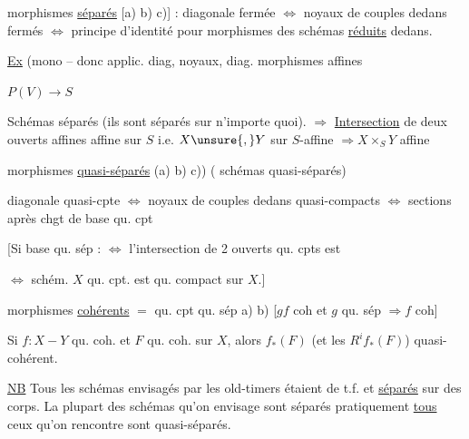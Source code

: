 
morphismes \uline{séparés} [a) b) c)] : diagonale fermée $\Longleftrightarrow$ noyaux de couples dedans fermés $\Longleftrightarrow$ principe d'identité pour morphismes des schémas \uline{réduits} dedans.

\uline{Ex} (mono -- donc applic. diag, noyaux, diag. morphismes affines


$P(V)\longrightarrow S$

Schémas séparés (ils sont séparés sur n'importe quoi). $\Rightarrow$ \uline{Intersection}  de deux ouverts affines affine sur $S$ i.e. $X\unsure{,}Y$ sur $S$-affine $\Rightarrow X\times_S Y$ affine


morphismes \uline{quasi-séparés} (a) b) c)) ( schémas quasi-séparés)

diagonale quasi-cpte $\Longleftrightarrow$ noyaux de couples dedans quasi-compacts $\Longleftrightarrow$ sections après chgt de base qu. cpt

 [Si base qu. sép : $\Longleftrightarrow$  l'intersection de 2 ouverts qu. cpts est 


$\Longleftrightarrow$  schém.  $X$ qu. cpt. est qu. compact sur $X$.]


morphismes \uline{cohérents} $={}$ qu. cpt qu. sép \quad a) b) [$gf$ coh et $g$ qu. sép $\Rightarrow f$ coh]

Si $f:X\mathrel{-}Y$ qu. coh. et $F$ qu. coh. sur $X$, alors $f_*(F)$ (et les $R^i f_*(F)$) quasi-cohérent.


\uline{NB} Tous les schémas envisagés par les old-timers étaient de t.f. et \uline{séparés} sur des corps. La plupart des schémas qu'on envisage  sont séparés pratiquement \uline{tous} ceux qu'on rencontre sont quasi-séparés.

